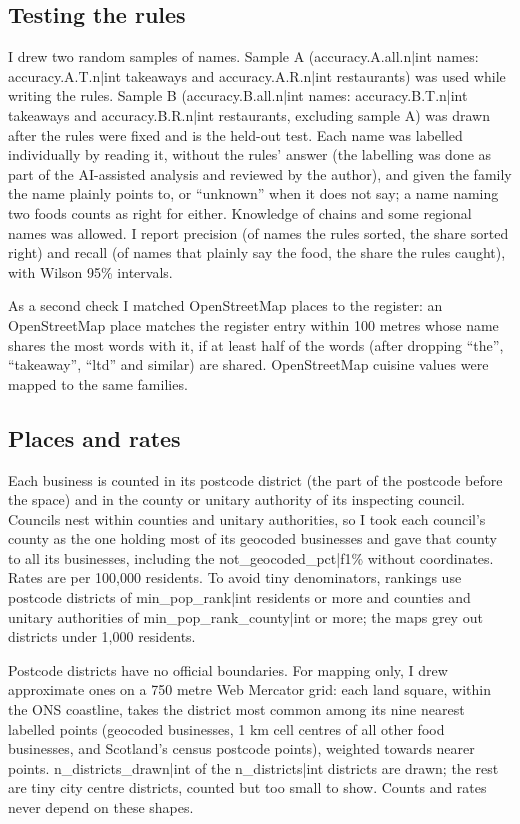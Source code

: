 \documentclass[11pt,a4paper]{article}
\begin{document}
\subsection{Testing the rules}

I drew two random samples of names. Sample A ({{accuracy.A.all.n|int}} names: {{accuracy.A.T.n|int}} takeaways and {{accuracy.A.R.n|int}} restaurants) was used while writing the rules. Sample B ({{accuracy.B.all.n|int}} names: {{accuracy.B.T.n|int}} takeaways and {{accuracy.B.R.n|int}} restaurants, excluding sample A) was drawn after the rules were fixed and is the held-out test. Each name was labelled individually by reading it, without the rules' answer (the labelling was done as part of the AI-assisted analysis and reviewed by the author), and given the family the name plainly points to, or ``unknown'' when it does not say; a name naming two foods counts as right for either. Knowledge of chains and some regional names was allowed. I report precision (of names the rules sorted, the share sorted right) and recall (of names that plainly say the food, the share the rules caught), with Wilson 95\% intervals.

As a second check I matched OpenStreetMap places to the register: an OpenStreetMap place matches the register entry within 100 metres whose name shares the most words with it, if at least half of the words (after dropping ``the'', ``takeaway'', ``ltd'' and similar) are shared. OpenStreetMap cuisine values were mapped to the same families.

\subsection{Places and rates}

Each business is counted in its postcode district (the part of the postcode before the space) and in the county or unitary authority of its inspecting council. Councils nest within counties and unitary authorities, so I took each council's county as the one holding most of its geocoded businesses and gave that county to all its businesses, including the {{not_geocoded_pct|f1}}\% without coordinates. Rates are per 100,000 residents. To avoid tiny denominators, rankings use postcode districts of {{min_pop_rank|int}} residents or more and counties and unitary authorities of {{min_pop_rank_county|int}} or more; the maps grey out districts under 1,000 residents.

Postcode districts have no official boundaries. For mapping only, I drew approximate ones on a 750 metre Web Mercator grid: each land square, within the ONS coastline, takes the district most common among its nine nearest labelled points (geocoded businesses, 1 km cell centres of all other food businesses, and Scotland's census postcode points), weighted towards nearer points. {{n_districts_drawn|int}} of the {{n_districts|int}} districts are drawn; the rest are tiny city centre districts, counted but too small to show. Counts and rates never depend on these shapes.
\end{document}
